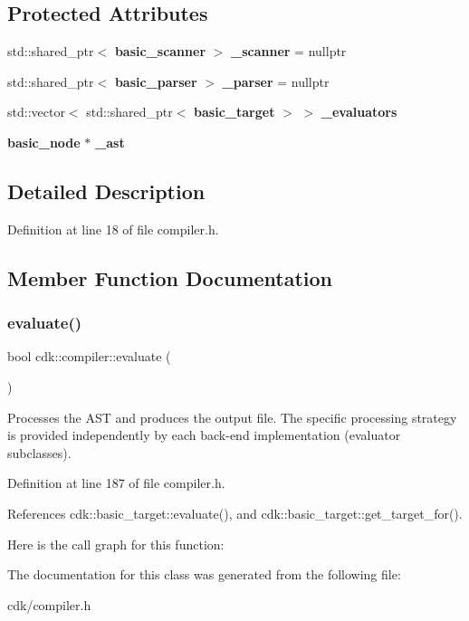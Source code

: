 \subsection*{Protected Attributes}
\begin{DoxyCompactItemize}
\item 
\mbox{\label{classcdk_1_1compiler_aae1fd7a956e254db62736223f36abfe1}} 
std\+::shared\+\_\+ptr$<$ \textbf{ basic\+\_\+scanner} $>$ {\bfseries \+\_\+scanner} = nullptr
\item 
\mbox{\label{classcdk_1_1compiler_a4cf06cfabdd2a17f1f00c875cf67f27a}} 
std\+::shared\+\_\+ptr$<$ \textbf{ basic\+\_\+parser} $>$ {\bfseries \+\_\+parser} = nullptr
\item 
\mbox{\label{classcdk_1_1compiler_a1effd69d16b8b813ee1abfa47a9152cb}} 
std\+::vector$<$ std\+::shared\+\_\+ptr$<$ \textbf{ basic\+\_\+target} $>$ $>$ {\bfseries \+\_\+evaluators}
\item 
\mbox{\label{classcdk_1_1compiler_a9d9ee8c3f17a0c87ba64f3e86aa7e52f}} 
\textbf{ basic\+\_\+node} $\ast$ {\bfseries \+\_\+ast}
\end{DoxyCompactItemize}


\subsection{Detailed Description}


Definition at line 18 of file compiler.\+h.



\subsection{Member Function Documentation}
\mbox{\label{classcdk_1_1compiler_a0c0d48f8b1101bb17bd1908785d62eff}} 
\subsubsection{evaluate()}
{\footnotesize\ttfamily bool cdk\+::compiler\+::evaluate (\begin{DoxyParamCaption}{ }\end{DoxyParamCaption})\hspace{0.3cm}{\ttfamily [inline]}}

Processes the A\+ST and produces the output file. The specific processing strategy is provided independently by each back-\/end implementation (evaluator subclasses). 

Definition at line 187 of file compiler.\+h.



References cdk\+::basic\+\_\+target\+::evaluate(), and cdk\+::basic\+\_\+target\+::get\+\_\+target\+\_\+for().

Here is the call graph for this function\+:


The documentation for this class was generated from the following file\+:\begin{DoxyCompactItemize}
\item 
cdk/compiler.\+h\end{DoxyCompactItemize}
